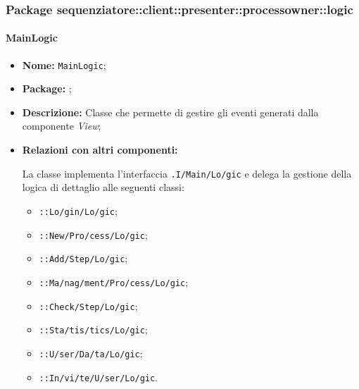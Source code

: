 \subsubsection{Package sequenziatore::client::presenter::processowner::logic}

\paragraph{MainLogic}
\begin{flushleft}
\begin{itemize}
\item \textbf{Nome:} \texttt{MainLogic};
\item \textbf{Package:} \texttt{\logicAdmin{}};
\item \textbf{Descrizione:} Classe che permette di gestire gli eventi generati dalla componente \textit{View};
\item \textbf{Relazioni con altri componenti:}
\begin{sloppypar}
La classe implementa l'interfaccia \texttt{\iLogicAdmin{}.I\fshyp{}Main\fshyp{}Lo\fshyp{}gic} e delega la gestione della logica di dettaglio alle seguenti classi:
\end{sloppypar}
\begin{itemize}
\item \texttt{\logicAdmin{}::Lo\fshyp{}gin\fshyp{}Lo\fshyp{}gic};
\item \texttt{\logicAdmin{}::New\fshyp{}Pro\fshyp{}cess\fshyp{}Lo\fshyp{}gic};
\item \texttt{\logicAdmin{}::Add\fshyp{}Step\fshyp{}Lo\fshyp{}gic};
\item \texttt{\logicAdmin{}::Ma\fshyp{}nag\fshyp{}ment\fshyp{}Pro\fshyp{}cess\fshyp{}Lo\fshyp{}gic};
\item \texttt{\logicAdmin{}::Check\fshyp{}Step\fshyp{}Lo\fshyp{}gic};
\item \texttt{\logicAdmin{}::Sta\fshyp{}tis\fshyp{}tics\fshyp{}Lo\fshyp{}gic};
\item \texttt{\logicAdmin{}::U\fshyp{}ser\fshyp{}Da\fshyp{}ta\fshyp{}Lo\fshyp{}gic};
\item \texttt{\logicAdmin{}::In\fshyp{}vi\fshyp{}te\fshyp{}U\fshyp{}ser\fshyp{}Lo\fshyp{}gic}.
\end{itemize}
\end{itemize}
\end{flushleft}

